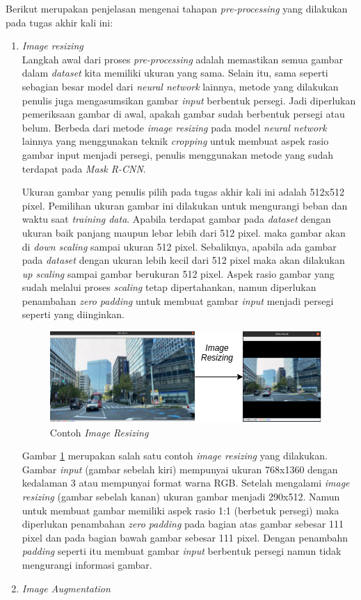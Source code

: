 Berikut merupakan penjelasan mengenai tahapan \textit{pre-processing} yang dilakukan pada tugas akhir kali ini:
\begin{enumerate}
	\item \textit{Image resizing}\\
		Langkah awal dari proses \textit{pre-processing} adalah memastikan semua gambar dalam \textit{dataset} kita memiliki ukuran yang sama. Selain itu, sama seperti sebagian besar model dari \textit{neural network} lainnya, metode yang dilakukan penulis juga mengasumsikan gambar \textit{input} berbentuk persegi. Jadi diperlukan pemeriksaan gambar di awal, apakah gambar sudah berbentuk persegi atau belum. Berbeda dari metode \textit{image resizing} pada model \textit{neural network} lainnya yang menggunakan teknik \textit{cropping} untuk membuat aspek rasio gambar input menjadi persegi, penulis menggunakan metode yang sudah terdapat pada \textit{Mask R-CNN}.
		
		Ukuran gambar yang penulis pilih pada tugas akhir kali ini adalah 512x512 pixel. Pemilihan ukuran gambar ini dilakukan untuk mengurangi beban dan waktu saat \textit{training data}. Apabila terdapat gambar pada \textit{dataset} dengan ukuran baik panjang maupun lebar lebih dari 512 pixel. maka gambar akan di \textit{down scaling} sampai ukuran 512 pixel. Sebaliknya, apabila ada gambar pada \textit{dataset} dengan ukuran lebih kecil dari 512 pixel maka akan dilakukan \textit{up scaling} sampai gambar berukuran 512 pixel. Aspek rasio gambar yang sudah melalui proses \textit{scaling} tetap dipertahankan, namun diperlukan penambahan \textit{zero padding} untuk membuat gambar \textit{input} menjadi persegi seperti yang diinginkan.
		
		\begin{figure}[ht]
			\centering
			\includegraphics[scale=0.7]{gambar/image-resizing.png}
			\caption{Contoh \textit{Image Resizing}}
			\label{fig:image-resizing}
		\end{figure}
		
		Gambar \ref{fig:image-resizing} merupakan salah satu contoh \textit{image resizing} yang dilakukan. Gambar \textit{input} (gambar sebelah kiri) mempunyai ukuran 768x1360 dengan kedalaman 3 atau mempunyai format warna RGB. Setelah mengalami \textit{image resizing} (gambar sebelah kanan) ukuran gambar menjadi 290x512. Namun untuk membuat gambar memiliki aspek rasio 1:1 (berbetuk persegi) maka diperlukan penambahan \textit{zero padding} pada bagian atas gambar sebesar 111 pixel dan pada bagian bawah gambar sebesar 111 pixel. Dengan penambahn \textit{padding} seperti itu membuat gambar \textit{input} berbentuk persegi namun tidak mengurangi informasi gambar. 
		   
	\item \textit{Image Augmentation}\\
\end{enumerate}


